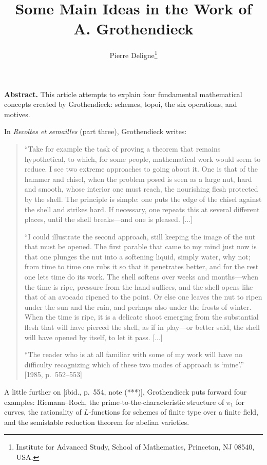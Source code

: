 \documentclass[11pt,a4paper]{article}
\title{\textbf{Some Main Ideas in the Work of A. Grothendieck}}
\author{Pierre Deligne\footnote{Institute for Advanced Study, School of Mathematics, Princeton, NJ 08540, USA.}}
\date{}
\theoremstyle{plain}
\theoremstyle{definition}
\begin{document}
\maketitle

\noindent\textbf{Abstract.} This article attempts to explain four fundamental mathematical concepts created by Grothendieck: schemes, topoi, the six operations, and motives.

\bigskip
\noindent In \emph{Recoltes et semailles} (part three), Grothendieck writes:

\begin{quote}
``Take for example the task of proving a theorem that remains hypothetical, to which, for some people, mathematical work would seem to reduce. I see two extreme approaches to going about it. One is that of the hammer and chisel, when the problem posed is seen as a large nut, hard and smooth, whose interior one must reach, the nourishing flesh protected by the shell. The principle is simple: one puts the edge of the chisel against the shell and strikes hard. If necessary, one repeats this at several different places, until the shell breaks---and one is pleased. [...]

``I could illustrate the second approach, still keeping the image of the nut that must be opened. The first parable that came to my mind just now is that one plunges the nut into a softening liquid, simply water, why not; from time to time one rubs it so that it penetrates better, and for the rest one lets time do its work. The shell softens over weeks and months---when the time is ripe, pressure from the hand suffices, and the shell opens like that of an avocado ripened to the point. Or else one leaves the nut to ripen under the sun and the rain, and perhaps also under the frosts of winter. When the time is ripe, it is a delicate shoot emerging from the substantial flesh that will have pierced the shell, as if in play---or better said, the shell will have opened by itself, to let it pass. [...]

``The reader who is at all familiar with some of my work will have no difficulty recognizing which of these two modes of approach is `mine'.'' [1985, p.~552--553]
\end{quote}

A little further on [ibid., p.~554, note (***)], Grothendieck puts forward four examples: Riemann--Roch, the prime-to-the-characteristic structure of $\pi_1$ for curves, the rationality of $L$-functions for schemes of finite type over a finite field, and the semistable reduction theorem for abelian varieties.
\end{document}

